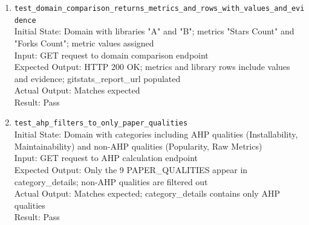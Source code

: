 \documentclass[12pt, titlepage]{article}
\begin{document}
\begin{enumerate}
      \\Initial State: Domain with libraries "A" and "B"; metric "Score" exists; rules.json and categories.json mocked
      \\Input: GET request to AHP calculation endpoint
      \\Expected Output: HTTP 200 OK; global ranking includes both libraries; ahp\_results populated for both
      \\Actual Output: Matches expected; overall\_score and category\_scores present
      \\Result: Pass
    \item \texttt{test\_domain\_comparison\_returns\_metrics\_and\_rows\_with\_values\_and\_evidence} \label{test-domain-comparison-returns-metrics-and-rows-with-values-and-evidence}
      \\Initial State: Domain with libraries "A" and "B"; metrics "Stars Count" and "Forks Count"; metric values assigned
      \\Input: GET request to domain comparison endpoint
      \\Expected Output: HTTP 200 OK; metrics and library rows include values and evidence; gitstats\_report\_url populated
      \\Actual Output: Matches expected
      \\Result: Pass
    \item \texttt{test\_ahp\_filters\_to\_only\_paper\_qualities} \label{test-ahp-filters-to-only-paper-qualities}
      \\Initial State: Domain with categories including AHP qualities (Installability, Maintainability) and non-AHP qualities (Popularity, Raw Metrics)
      \\Input: GET request to AHP calculation endpoint
      \\Expected Output: Only the 9 PAPER\_QUALITIES appear in category\_details; non-AHP qualities are filtered out
      \\Actual Output: Matches expected; category\_details contains only AHP qualities
      \\Result: Pass
  \end{enumerate}
\end{document}
